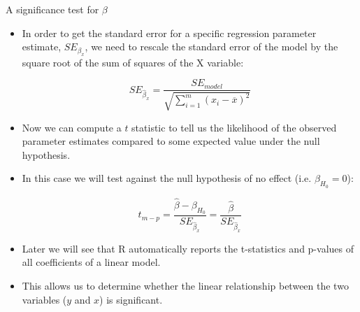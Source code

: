 \documentclass[handout]{beamer}
\begin{document}
\begin{frame}{A significance test for $\beta$}
\scriptsize{
\begin{itemize}

 \item In order to get the standard error for a specific regression parameter estimate, $SE_{\beta_x}$, we need to rescale the standard error of the model by the square root of the sum of squares of the X variable:
 
 \begin{displaymath}
  SE_{\hat{\beta}_x} = \frac{SE_{model}}{\sqrt{\sum_{i=1}^m(x_i-\overline{x})^2}}
   \end{displaymath}


  \item Now we can compute a $t$ statistic to tell us the likelihood of the observed parameter estimates compared to some expected value under the null hypothesis. 
   
 \item In this case we will test against the null hypothesis of no effect (i.e. $\beta_{H_0}=0$):
 
 \begin{displaymath}
  t_{m-p} = \frac{\hat{\beta}-\beta_{H_0}}{ SE_{\hat{\beta}_x}} = \frac{\hat{\beta}}{ SE_{\hat{\beta}_x}}
 \end{displaymath}

 \item Later we will see that R automatically reports the t-statistics and p-values of all coefficients of a linear model.
 
 \item This allows us to determine whether the linear relationship between the two variables ($y$ and $x$) is significant.
 
\end{itemize}


}
 
\end{frame}
\end{document}
